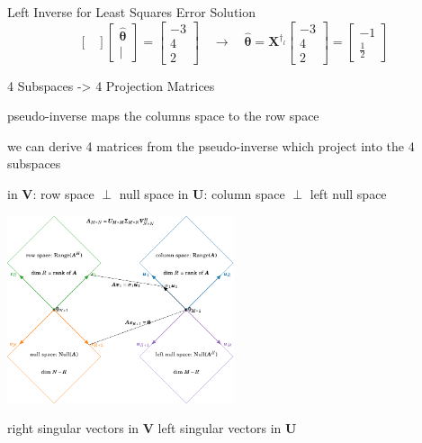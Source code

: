 \documentclass[mathserif, aspectratio=1610]{intbeamer}
\begin{document}
\begin{frame}[t]{Left Inverse for Least Squares Error Solution}
$$\begin{bmatrix}
\end{bmatrix}
\begin{bmatrix}
\hat{\bm{\theta}} \\ |
\end{bmatrix}=
\begin{bmatrix}
-3 \\ 4 \\ 2
\end{bmatrix}
\quad
\rightarrow
\quad
\hat{\bm{\theta}} =
\bm{X}^{\dagger_l}
\begin{bmatrix}
-3 \\ 4 \\ 2
\end{bmatrix}
=
\begin{bmatrix}
-1 \\ \frac{1}{2}
\end{bmatrix}
$$



\end{frame}










\begin{frame}[t]{4 Subspaces -> 4 Projection Matrices}

pseudo-inverse maps the columns space to the row space

we can derive 4 matrices from the pseudo-inverse which project into the 4 subspaces

\hspace{0.75cm}
in $\bm{V}$: \textcolor{C2}{row space} $\perp$ \textcolor{C1}{null space}
\hspace{2cm}
in $\bm{U}$: \textcolor{C0}{column space} $\perp$ \textcolor{C4}{left null space}

\centering
\includegraphics[width=0.5\textwidth]{four_subspaces.pdf}

\hspace{0.75cm}
right singular vectors in $\bm{V}$
\hspace{4.5cm}
left singular vectors in $\bm{U}$

\end{frame}
\end{document}
